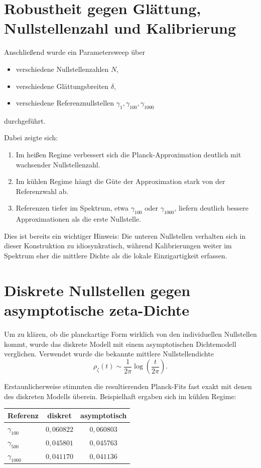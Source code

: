 \documentclass[11pt,a4paper]{article}
\theoremstyle{definition}
\theoremstyle{remark}
\begin{document}
	\section{Robustheit gegen Glättung, Nullstellenzahl und Kalibrierung}
	
	Anschließend wurde ein Parametersweep über
	\begin{itemize}[leftmargin=1.5em]
		\item verschiedene Nullstellenzahlen $N$,
		\item verschiedene Glättungsbreiten $\delta$,
		\item verschiedene Referenznullstellen $\gamma_1,\gamma_{100},\gamma_{1000}$
	\end{itemize}
	durchgeführt.
	
	Dabei zeigte sich:
	\begin{enumerate}[leftmargin=1.5em]
		\item Im heißen Regime verbessert sich die Planck-Approximation deutlich mit wachsender Nullstellenzahl.
		\item Im kühlen Regime hängt die Güte der Approximation stark von der Referenzwahl ab.
		\item Referenzen tiefer im Spektrum, etwa $\gamma_{100}$ oder $\gamma_{1000}$, liefern deutlich bessere Approximationen als die erste Nullstelle.
	\end{enumerate}
	
	Dies ist bereits ein wichtiger Hinweis: Die unteren Nullstellen verhalten sich in dieser Konstruktion zu idiosynkratisch, während Kalibrierungen weiter im Spektrum eher die mittlere Dichte als die lokale Einzigartigkeit erfassen.
	
	\section{Diskrete Nullstellen gegen asymptotische zeta-Dichte}
	
	Um zu klären, ob die planckartige Form wirklich von den individuellen Nullstellen kommt, wurde das diskrete Modell mit einem asymptotischen Dichtemodell verglichen. Verwendet wurde die bekannte mittlere Nullstellendichte
	\[
	\rho_\zeta(t)\sim \frac{1}{2\pi}\log\!\left(\frac{t}{2\pi}\right).
	\]
	
	Erstaunlicherweise stimmten die resultierenden Planck-Fits fast exakt mit denen des diskreten Modells überein. Beispielhaft ergaben sich im kühlen Regime:
	\begin{center}
		\begin{tabular}{lcc}
			\toprule
			Referenz & diskret & asymptotisch \\
			\midrule
			$\gamma_{100}$  & $0{,}060822$ & $0{,}060803$ \\
			$\gamma_{500}$  & $0{,}045801$ & $0{,}045763$ \\
			$\gamma_{1000}$ & $0{,}041170$ & $0{,}041136$ \\
			\bottomrule
		\end{tabular}
	\end{center}
	
\end{document}
